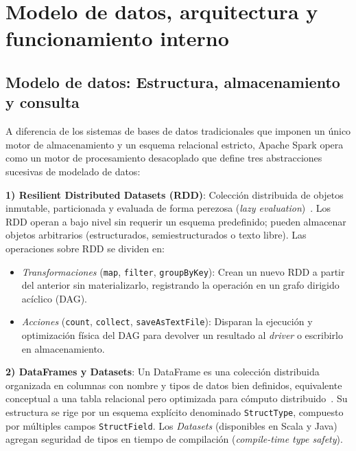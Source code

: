 \documentclass[conference,a4paper]{IEEEtran}
\begin{document}
\section{Modelo de datos, arquitectura y funcionamiento interno}
\label{sec:modelo-arquitectura}

\subsection{Modelo de datos: Estructura, almacenamiento y consulta}

A diferencia de los sistemas de bases de datos tradicionales que imponen un único motor de almacenamiento y un esquema relacional estricto, Apache Spark opera como un motor de procesamiento desacoplado que define tres abstracciones sucesivas de modelado de datos:

\textbf{1) Resilient Distributed Datasets (RDD)}: Colección distribuida de objetos inmutable, particionada y evaluada de forma perezosa (\textit{lazy evaluation})~\cite{zaharia2012rdd}. Los RDD operan a bajo nivel sin requerir un esquema predefinido; pueden almacenar objetos arbitrarios (estructurados, semiestructurados o texto libre). Las operaciones sobre RDD se dividen en:
\begin{itemize}
\item \textit{Transformaciones} (\texttt{map}, \texttt{filter}, \texttt{groupByKey}): Crean un nuevo RDD a partir del anterior sin materializarlo, registrando la operación en un grafo dirigido acíclico (DAG).
\item \textit{Acciones} (\texttt{count}, \texttt{collect}, \texttt{saveAsTextFile}): Disparan la ejecución y optimización física del DAG para devolver un resultado al \textit{driver} o escribirlo en almacenamiento.
\end{itemize}

\textbf{2) DataFrames y Datasets}: Un DataFrame es una colección distribuida organizada en columnas con nombre y tipos de datos bien definidos, equivalente conceptual a una tabla relacional pero optimizada para cómputo distribuido~\cite{spark-sql}. Su estructura se rige por un esquema explícito denominado \texttt{StructType}, compuesto por múltiples campos \texttt{StructField}. Los \textit{Datasets} (disponibles en Scala y Java) agregan seguridad de tipos en tiempo de compilación (\textit{compile-time type safety}).
\end{document}
